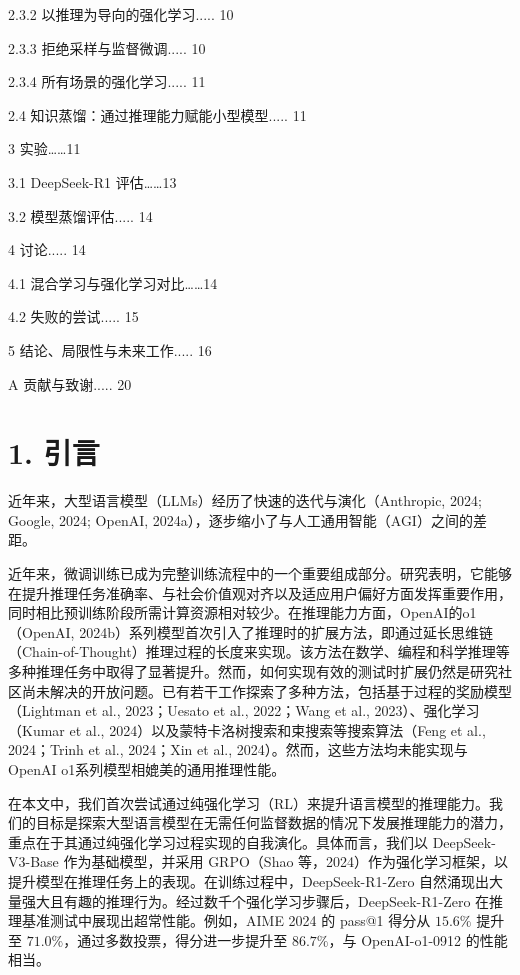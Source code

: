 \documentclass[12pt,a4paper]{report} %
\begin{document}
2.3.2 以推理为导向的强化学习..... 10


2.3.3 拒绝采样与监督微调..... 10


2.3.4 所有场景的强化学习..... 11


2.4 知识蒸馏：通过推理能力赋能小型模型..... 11


3 实验……11


3.1 DeepSeek-R1 评估……13


3.2 模型蒸馏评估..... 14


4 讨论..... 14


4.1 混合学习与强化学习对比……14


4.2 失败的尝试..... 15


5 结论、局限性与未来工作..... 16


A 贡献与致谢..... 20
\section*{1. 引言}


近年来，大型语言模型（LLMs）经历了快速的迭代与演化（Anthropic, 2024; Google, 2024; OpenAI, 2024a），逐步缩小了与人工通用智能（AGI）之间的差距。


近年来，微调训练已成为完整训练流程中的一个重要组成部分。研究表明，它能够在提升推理任务准确率、与社会价值观对齐以及适应用户偏好方面发挥重要作用，同时相比预训练阶段所需计算资源相对较少。在推理能力方面，OpenAI的o1（OpenAI, 2024b）系列模型首次引入了推理时的扩展方法，即通过延长思维链（Chain-of-Thought）推理过程的长度来实现。该方法在数学、编程和科学推理等多种推理任务中取得了显著提升。然而，如何实现有效的测试时扩展仍然是研究社区尚未解决的开放问题。已有若干工作探索了多种方法，包括基于过程的奖励模型（Lightman et al., 2023；Uesato et al., 2022；Wang et al., 2023）、强化学习（Kumar et al., 2024）以及蒙特卡洛树搜索和束搜索等搜索算法（Feng et al., 2024；Trinh et al., 2024；Xin et al., 2024）。然而，这些方法均未能实现与OpenAI o1系列模型相媲美的通用推理性能。


在本文中，我们首次尝试通过纯强化学习（RL）来提升语言模型的推理能力。我们的目标是探索大型语言模型在无需任何监督数据的情况下发展推理能力的潜力，重点在于其通过纯强化学习过程实现的自我演化。具体而言，我们以 DeepSeek-V3-Base 作为基础模型，并采用 GRPO（Shao 等，2024）作为强化学习框架，以提升模型在推理任务上的表现。在训练过程中，DeepSeek-R1-Zero 自然涌现出大量强大且有趣的推理行为。经过数千个强化学习步骤后，DeepSeek-R1-Zero 在推理基准测试中展现出超常性能。例如，AIME 2024 的 pass@1 得分从 $15.6 \%$ 提升至 $71.0 \%$，通过多数投票，得分进一步提升至 $86.7 \%$，与 OpenAI-o1-0912 的性能相当。
\end{document}
